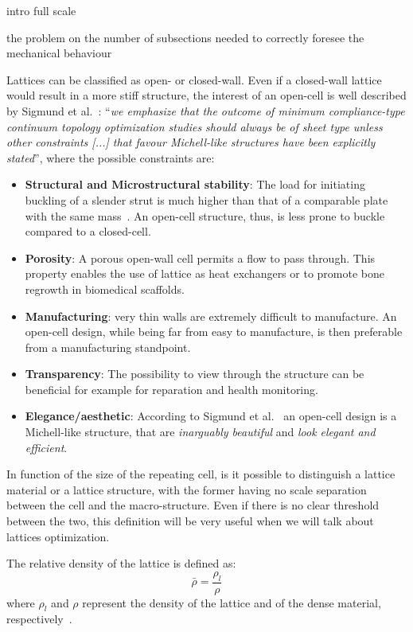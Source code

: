 intro full scale

the problem on the number of subsections needed to correctly foresee the mechanical behaviour





Lattices can be classified as open- or closed-wall. Even if a closed-wall lattice would result in a more stiff structure, the interest of an open-cell is well described by Sigmund et al.~: ``\textit{we emphasize that the outcome of minimum compliance-type continuum topology optimization studies should always be of sheet type unless other constraints [...] that favour Michell-like structures have been explicitly stated}'', where the possible constraints are:
\begin{itemize}
    \item \textbf{Structural and Microstructural stability}: The load for initiating buckling of a slender strut is much higher than that of a comparable plate with the same mass~. An open-cell structure, thus, is less prone to buckle compared to a closed-cell.
    \item \textbf{Porosity}: A porous open-wall cell permits a flow to pass through. This property enables the use of lattice as heat exchangers or to promote bone regrowth in biomedical scaffolds.
    \item \textbf{Manufacturing}: very thin walls are extremely difficult to manufacture. An open-cell design, while being far from easy to manufacture, is then preferable from a manufacturing standpoint. 
    \item \textbf{Transparency}: The possibility to view through the structure can be beneficial for example for reparation and health monitoring.
    \item \textbf{Elegance/aesthetic}: According to Sigmund et al.~\cite{sigmund_non-optimality_2016} an open-cell design is a Michell-like structure, that are \textit{inarguably beautiful} and \textit{look elegant and efficient}.
\end{itemize}

In function of the size of the repeating cell, is it possible to distinguish a lattice material or a lattice structure, with the former having no scale separation between the cell and the macro-structure. Even if there is no clear threshold between the two, this definition will be very useful when we will talk about lattices optimization.

The relative density of the lattice is defined as:
\begin{equation}
    \bar{\rho} = \frac{\rho_l}{\rho}
\end{equation}
where $\rho_l$ and $\rho$ represent the density of the lattice and of the dense material, respectively~.

